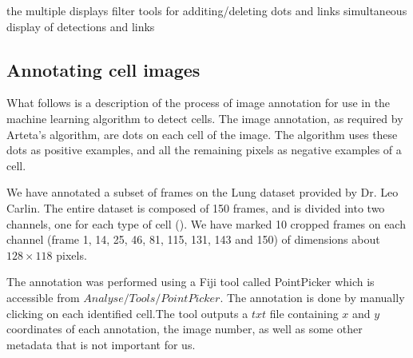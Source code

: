     	the multiple displays
    	filter
    	tools for additing/deleting dots and links
    	simultaneous display of detections and links    
    
    \subsection{Annotating cell images }
    What follows is a description of the process of image annotation for use in the machine learning algorithm to detect cells. The image annotation, as required by Arteta's \cite{arteta12} algorithm, are dots on each cell of the image. The algorithm uses these dots as positive examples, and all the remaining pixels as negative examples of a cell.
    
    We have annotated a subset of frames on the Lung dataset provided by Dr. Leo Carlin. The entire dataset is composed of 150 frames, and is divided into two channels, one for each type of cell (). We have marked 10 cropped frames on each channel (frame 1, 14, 25, 46, 81, 115, 131, 143 and 150) of dimensions about $128\times118$ pixels.
    
    The annotation was performed using a Fiji \cite{fiji12} tool called PointPicker \cite{thevanez14} which is accessible from \(Analyse/Tools/PointPicker\). The annotation is done by manually clicking on each identified cell.The tool outputs a $txt$ file containing $x$ and $y$ coordinates of each annotation, the image number, as well as some other metadata that is not important for us.
    
